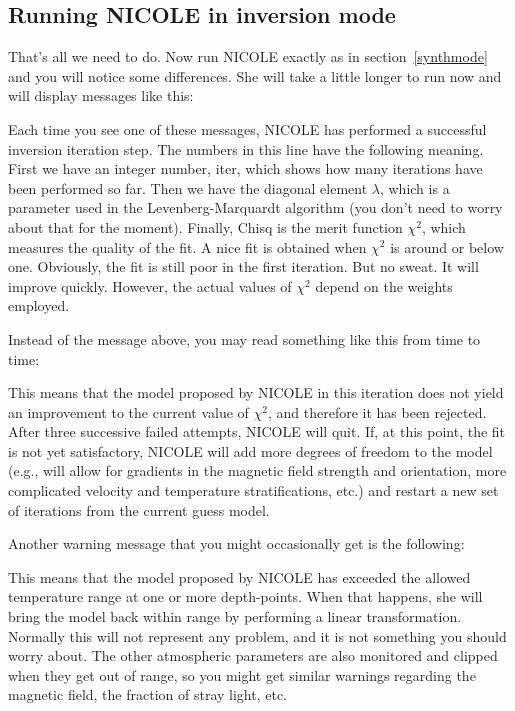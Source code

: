 \subsection{Running NICOLE in inversion mode}

That's all we need to do. Now run NICOLE exactly as in
section~\ref{synthmode} and you will notice some differences. She will
take a little longer to run now and will display messages like this:

\vskip12pt
\vskip12pt

Each time you see one of these messages, NICOLE has performed a
successful inversion iteration step.  The numbers in this line have
the following meaning. First we have an integer number, iter, which
shows how many iterations have been performed so far.  Then we have
the diagonal element $\lambda$, which is a parameter used in the
Levenberg-Marquardt algorithm (you don't need to worry about that for
the moment). Finally, Chisq is the merit function $\chi^2$, which
measures the quality of the fit.  A nice fit is obtained when $\chi^2$
is around or below one.  Obviously, the fit is still poor in the first
iteration.  But no sweat. It will improve quickly. However, the actual
values of $\chi^2$ depend on the weights employed.

Instead of the message above, you may read something like 
this from time to time:

\vskip12pt 
\vskip12pt

This means that the model proposed by NICOLE in this iteration does
not yield an improvement to the current value of $\chi^2$, and
therefore it has been rejected. After three successive failed
attempts, NICOLE will quit. If, at this point, the fit is not yet
satisfactory, NICOLE will add more degrees of freedom to the model
(e.g., will allow for gradients in the magnetic field strength and
orientation, more complicated velocity and temperature
stratifications, etc.)  and restart a new set of iterations from the
current guess model.


Another warning message that you might occasionally get is the following:

\vskip12pt
\vskip12pt

This means that the model proposed by NICOLE has exceeded the allowed 
temperature range at one or more depth-points. When that happens, 
she will bring the model back within range by performing a linear 
transformation. Normally this will not represent any problem,
and it is not something you should worry about. The other 
atmospheric parameters are also monitored and clipped when they get 
out of range, so you might get similar warnings regarding the magnetic 
field, the fraction of stray light, etc.


